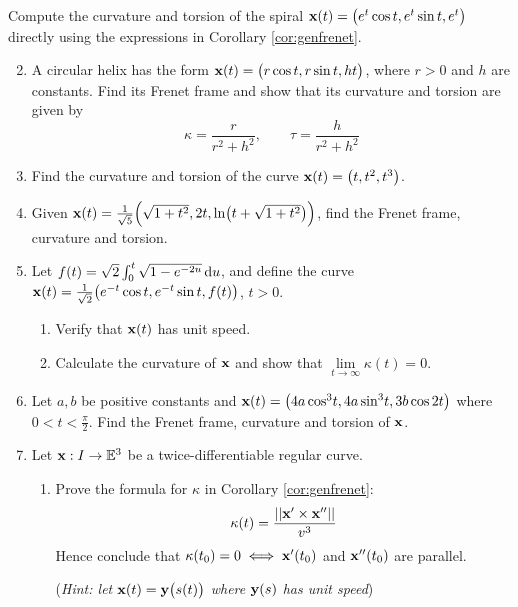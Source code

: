 \begin{exercises}
	\exstart Compute the curvature and torsion of the spiral ${\mathbf{x}}(t)=\bigl(e^t\cos t,e^t\sin t,e^t\bigr)$ directly using the expressions in Corollary \ref{cor:genfrenet}.


	\begin{enumerate}\setcounter{enumi}{1}
		\item\label{exs:genhelixcurv} A circular helix has the form ${\mathbf{x}}(t)=\bigl(r\cos t,r\sin t,ht\bigr)$, where $r>0$ and $h$ are constants. Find its Frenet frame and show that its curvature and torsion are given by
	  \[
	  	\kappa=\frac{r}{r^2+h^2},\qquad\tau=\frac{h}{r^2+h^2}
	  \]
	
	
		\item Find the curvature and torsion of the curve ${\mathbf{x}}(t)=\bigl(t,t^2,t^3\bigr)$. 
	
	  
	  \item Given ${\mathbf{x}}(t)=\frac 1{\sqrt 5}\Bigl(\sqrt{1+t^2}, 2t ,\ln\bigl(t+\sqrt{1+t^2}\bigr)\Bigr)$, find the Frenet frame, curvature and torsion.
	  
	  
	  \item Let $f(t)=\sqrt 2\int_0^t\sqrt{1-e^{-2u}}\,{\mathrm{d} u}$, and define the curve ${\mathbf{x}}(t)=\frac 1{\sqrt 2}\bigl(e^{-t}\cos t, e^{-t}\sin t, f(t)\bigr)$, $t>0$.
	  \begin{enumerate}
	    \item Verify that ${\mathbf{x}}(t)$ has unit speed.
	    \item Calculate the curvature of ${\mathbf{x}}$ and show that $\lim\limits_{t\to\infty}\kappa(t)=0$.
	  \end{enumerate}
	  
	  
	  \item Let $a,b$ be positive constants and ${\mathbf{x}}(t)=\bigl(4a\cos^3\!t, 4a\sin^3\!t, 3b\cos 2t\bigr)$ where $0<t<\frac\pi 2$. Find the Frenet frame, curvature and torsion of ${\mathbf{x}}$.
	  
	  
	  \item Let ${\mathbf{x}}:I\to\mathbb{E}^3$ be a twice-differentiable regular curve.
	  \begin{enumerate}
	    \item Prove the formula for $\kappa$ in Corollary \ref{cor:genfrenet}:
	  	\[
	  		\kappa(t)=\frac{\left| \left| {\mathbf{x}}'\times{\mathbf{x}}''\right|\right|}{v^3}
	  	\]
	  	Hence conclude that $\kappa(t_0)=0\iff{\mathbf{x}}'(t_0)$ and ${\mathbf{x}}''(t_0)$ are parallel.\par
			(\emph{Hint: let ${\mathbf{x}}(t)={\mathbf{y}}\bigl(s(t)\bigr)$ where ${\mathbf{y}}(s)$ has unit speed})
	  

\end{enumerate}
\end{enumerate}
\end{exercises}
